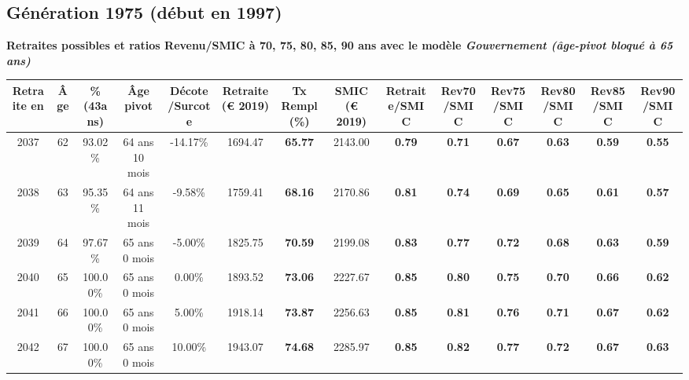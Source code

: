\subsection{Génération 1975 (début en 1997)} 

{\bf \noindent Retraites possibles et ratios Revenu/SMIC à 70, 75, 80, 85, 90 ans avec le modèle \emph{Gouvernement (âge-pivot bloqué à 65 ans)}}  
 
\begin{adjustbox}{max width=\textwidth} 
\begin{tabular}[htb]{|c|c||c|c|c||c|c||c||c|c|c|c|c|c|} 
\hline 
 Retraite en &  Âge &  \%(43ans) &  Âge pivot &  Décote/Surcote &  Retraite (\euro{} 2019) &  Tx Rempl(\%) &  SMIC (\euro{} 2019) &  Retraite/SMIC &  Rev70/SMIC &  Rev75/SMIC &  Rev80/SMIC &  Rev85/SMIC &  Rev90/SMIC \\ 
\hline \hline 
 2037 &  62 &  93.02\% &  64 ans 10 mois &  -14.17\% &  1694.47 &  {\bf 65.77} &  2143.00 &  {\bf {\color{red} 0.79}} &  {\bf {\color{red} 0.71}} &  {\bf {\color{red} 0.67}} &  {\bf {\color{red} 0.63}} &  {\bf {\color{red} 0.59}} &  {\bf {\color{red} 0.55}} \\ 
\hline 
 2038 &  63 &  95.35\% &  64 ans 11 mois &  -9.58\% &  1759.41 &  {\bf 68.16} &  2170.86 &  {\bf {\color{red} 0.81}} &  {\bf {\color{red} 0.74}} &  {\bf {\color{red} 0.69}} &  {\bf {\color{red} 0.65}} &  {\bf {\color{red} 0.61}} &  {\bf {\color{red} 0.57}} \\ 
\hline 
 2039 &  64 &  97.67\% &  65 ans 0 mois &  -5.00\% &  1825.75 &  {\bf 70.59} &  2199.08 &  {\bf {\color{red} 0.83}} &  {\bf {\color{red} 0.77}} &  {\bf {\color{red} 0.72}} &  {\bf {\color{red} 0.68}} &  {\bf {\color{red} 0.63}} &  {\bf {\color{red} 0.59}} \\ 
\hline 
 2040 &  65 &  100.00\% &  65 ans 0 mois &  0.00\% &  1893.52 &  {\bf 73.06} &  2227.67 &  {\bf {\color{red} 0.85}} &  {\bf {\color{red} 0.80}} &  {\bf {\color{red} 0.75}} &  {\bf {\color{red} 0.70}} &  {\bf {\color{red} 0.66}} &  {\bf {\color{red} 0.62}} \\ 
\hline 
 2041 &  66 &  100.00\% &  65 ans 0 mois &  5.00\% &  1918.14 &  {\bf 73.87} &  2256.63 &  {\bf {\color{red} 0.85}} &  {\bf {\color{red} 0.81}} &  {\bf {\color{red} 0.76}} &  {\bf {\color{red} 0.71}} &  {\bf {\color{red} 0.67}} &  {\bf {\color{red} 0.62}} \\ 
\hline 
 2042 &  67 &  100.00\% &  65 ans 0 mois &  10.00\% &  1943.07 &  {\bf 74.68} &  2285.97 &  {\bf {\color{red} 0.85}} &  {\bf {\color{red} 0.82}} &  {\bf {\color{red} 0.77}} &  {\bf {\color{red} 0.72}} &  {\bf {\color{red} 0.67}} &  {\bf {\color{red} 0.63}} \\ 
\hline 
\hline 
\end{tabular} 
\end{adjustbox} 
 
